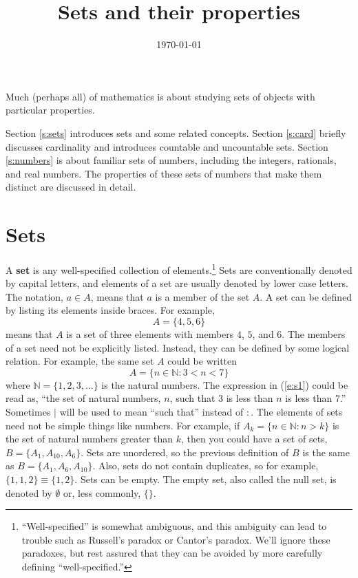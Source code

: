  

\title{Sets and their properties}
\date{\today}



\maketitle

Much (perhaps all) of mathematics is about studying sets of objects
with particular properties. 

Section \ref{s:sets} introduces sets and some related concepts.
Section \ref{s:card} briefly discusses cardinality and introduces
countable and uncountable sets. Section \ref{s:numbers} is about
familiar sets of numbers, including the integers, rationals, and real
numbers. The properties of these sets of numbers that make them
distinct are discussed in detail.


\section{Sets \label{s:sets}} 

A \textbf{set} is any well-specified collection of
elements.\footnote{``Well-specified'' is somewhat ambiguous, and this
  ambiguity can lead to trouble such as Russell's paradox or Cantor's
  paradox. We'll ignore these paradoxes, but rest assured that they
  can be avoided by more carefully defining ``well-specified.''
} Sets are conventionally denoted by capital letters, and
elements of a set are usually denoted by lower case letters. The
notation, $a \in A$, means that $a$ is a member of the set $A$. A set
can be defined by listing its elements inside braces. For example,
\[ A = \{ 4, 5, 6 \} \]
means that $A$ is a set of three elements with members $4$, $5$, and
$6$. The members of a set need not be explicitly listed. Instead, they
can be defined by some logical relation. For example, the same set $A$
could be written
\begin{equation}
  A = \{ n \in \mathbb{N} : 3 < n < 7 \}  \label{e:s1}
\end{equation}
where $\mathbb{N} = \{1, 2, 3, ... \}$ is the natural numbers. The
expression in (\ref{e:s1}) could be read as, ``the set of natural
numbers, $n$, such that 3 is less than $n$ is less than 7.''
Sometimes $|$ will be used to mean ``such that'' instead of $:$. The
elements of sets need not be simple things like numbers. For example,
if $A_k = \{ n \in \mathbb{N}: n > k \}$ is the set of natural numbers
greater than $k$, then you could have a set of sets, $B = \{ A_1,
A_{10}, A_{6} \}$.  Sets are unordered, so the previous definition of
$B$ is the same as $B = \{ A_1, A_6, A_{10} \}$. Also, sets do not
contain duplicates, so for example, $\{ 1, 1, 2 \} \equiv \{1, 2
\}$. Sets can be empty. The empty set, also called the null set, is
denoted by $\emptyset$ or, less commonly, $\{ \}$.

